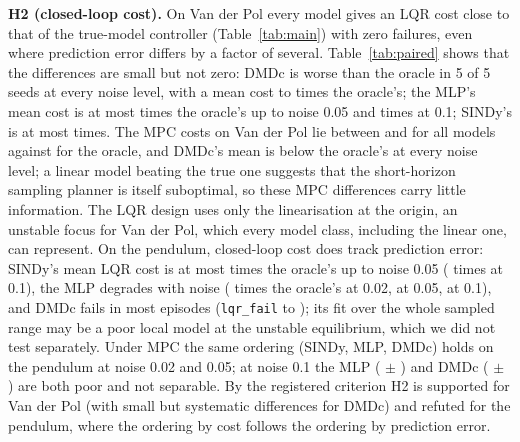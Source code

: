 \begin{table}[t]\centering\caption{LQR cost versus number of training transitions $N$ at noise 0.05: mean over 5 seeds (median).}\label{tab:ntrainlqr}
\resizebox{\columnwidth}{!}{}\end{table}

\textbf{H2 (closed-loop cost).} On Van der Pol every model gives an LQR cost close to that of the true-model controller (Table~\ref{tab:main}) with zero failures, even where prediction error differs by a factor of several. Table~\ref{tab:paired} shows that the differences are small but not zero: DMDc is worse than the oracle in 5 of 5 seeds at every noise level, with a mean cost  to  times the oracle's; the MLP's mean cost is at most  times the oracle's up to noise 0.05 and  times at 0.1; SINDy's is at most  times. The MPC costs on Van der Pol lie between  and  for all models against  for the oracle, and DMDc's mean is below the oracle's at every noise level; a linear model beating the true one suggests that the short-horizon sampling planner is itself suboptimal, so these MPC differences carry little information. The LQR design uses only the linearisation at the origin, an unstable focus for Van der Pol, which every model class, including the linear one, can represent. On the pendulum, closed-loop cost does track prediction error: SINDy's mean LQR cost is at most  times the oracle's up to noise 0.05 ( times at 0.1), the MLP degrades with noise ( times the oracle's at 0.02,  at 0.05,  at 0.1), and DMDc fails in most episodes (\texttt{lqr\_fail}  to ); its fit over the whole sampled range may be a poor local model at the unstable equilibrium, which we did not test separately. Under MPC the same ordering (SINDy, MLP, DMDc) holds on the pendulum at noise 0.02 and 0.05; at noise 0.1 the MLP ( $\pm$ ) and DMDc ( $\pm$ ) are both poor and not separable. By the registered criterion H2 is supported for Van der Pol (with small but systematic differences for DMDc) and refuted for the pendulum, where the ordering by cost follows the ordering by prediction error.

